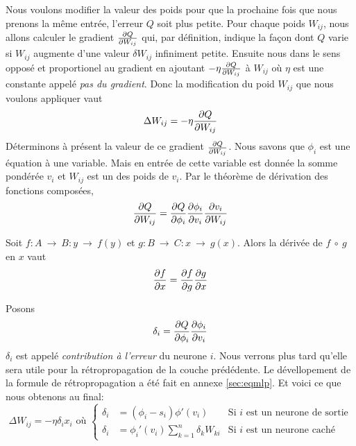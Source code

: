 Nous voulons modifier la valeur des poids pour que la prochaine fois que nous prenons la même entrée, l'erreur $Q$ soit plus petite.
Pour chaque poids $W_{ij}$, nous allons calculer le gradient $\frac{\partial Q}{\partial W_{ij}}$ qui, par définition, indique la façon dont $Q$ varie si $W_{ij}$ augmente d'une valeur $\delta W_{ij}$ infiniment petite.
Ensuite nous  dans le sens opposé et proportionel au gradient en ajoutant $-\eta\frac{\partial Q}{\partial W_{ij}}$ à $W_{ij}$ où $\eta$ est une constante appelé \emph{pas du gradient}.
Donc la modification du poid $W_{ij}$ que nous voulons appliquer vaut
\begin{equation}%
 \Delta W_{ij} = -\eta\partiel{Q}{W_{ij}}
\end{equation}
Déterminons à présent la valeur de ce gradient $\frac{\partial Q}{\partial W_{ij}}$.
Nous savons que $\phi_i$ est une équation à une variable.
Mais en entrée de cette variable est donnée la somme pondérée $v_i$ et $W_{ij}$ est un des poids de $v_i$.
Par le théorème de dérivation des fonctions composées,
\begin{equation}%
 \partiel{Q}{W_{ij}} = \partiel{Q}{\phi_i} \partiel{\phi_i}{v_i} \partiel{v_i}{W_{ij}}
\end{equation}
\begin{thm}
Soit $f:A~\rightarrow~B : y~\rightarrow~f(y)$ et $g:B~\rightarrow~C : x~\rightarrow~g(x)$. Alors la dérivée de $f~\circ~g$ en $x$ vaut
\[\frac{\partial f}{\partial x} = \frac{\partial f}{\partial g} \frac{\partial g}{\partial x}\]
\end{thm}
Posons
\begin{equation}%
 \delta_i = \partiel{Q}{\phi_i} \partiel{\phi_i}{v_i}
\end{equation}
$\delta_i$ est appelé \emph{contribution à l'erreur} du neurone $i$.
Nous verrons plus tard qu'elle sera utile pour la rétropropagation de la couche prédédente.
Le dévellopement de la formule de rétropropagation a été fait en annexe \ref{sec:eqmlp}.
Et voici ce que nous obtenons au final:\\
\begin{equation}\label{eq:mlpretro}
 \Delta W_{ij} = -\eta \delta_i x_i \text{~où~}\left\{
  \begin{array}{lll}
   \delta_i & = (\phi_i - s_i)\phi'(v_i) & \text{Si~} i \text{~est un neurone de sortie}\\
   \delta_i & = \phi_i'(v_i) \sum_{k=1}^{n} \delta_k W_{ki} & \text{Si~} i \text{~est un neurone caché}
  \end{array}
 \right.
\end{equation}

